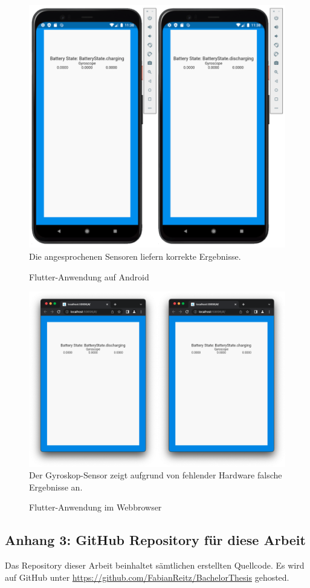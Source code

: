 \documentclass[a4paper]{scrartcl}
\begin{document}
\begin{figure}[H]
	\centering
	\caption{Flutter-Anwendung auf Android}
	\includegraphics[scale=0.35]{_assets/Android_Flutter.png} \\
	\justifying
	\small	
	Die angesprochenen Sensoren liefern korrekte Ergebnisse.
\end{figure}

\begin{figure}[H]
	\centering
	\caption{Flutter-Anwendung im Webbrowser}
	\includegraphics[scale=0.25]{_assets/WebApp_Flutter.png} \\
	\justifying
	\small	
	Der Gyroskop-Sensor zeigt aufgrund von fehlender Hardware falsche Ergebnisse an.
\end{figure}

\newpage

\subsection*{Anhang 3: GitHub Repository für diese Arbeit}

Das Repository dieser Arbeit beinhaltet sämtlichen erstellten Quellcode. Es wird auf GitHub unter \url{https://github.com/FabianReitz/BachelorThesis} gehosted.
\end{document}
